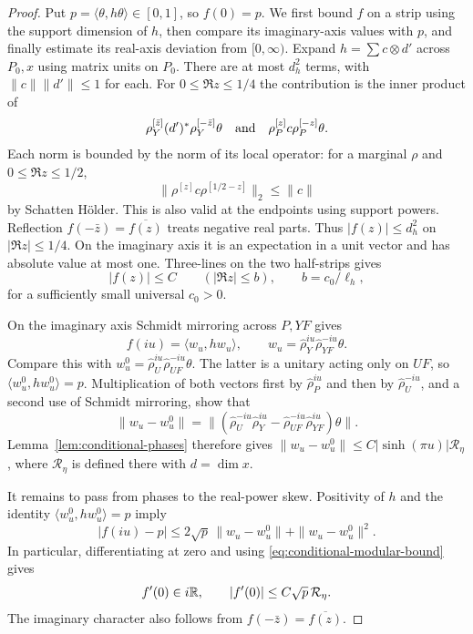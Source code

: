 \begin{proof}
Put $p=\langle\theta,h\theta\rangle\in[0,1]$, so $f(0)=p$.
We first bound $f$ on a strip using the support dimension of $h$,
then compare its imaginary-axis values with $p$, and finally estimate
its real-axis deviation from $[0,\infty)$.  Expand
$h=\sum c\otimes d'$ across $P_0,x$ using matrix units on $P_0$.
There are at most $d_h^2$ terms, with
$\|c\|\|d'\|\le1$ for each.  For $0\le\Re z\le1/4$ the
contribution is the inner product of
\[
 \rho_Y^{[\bar z]}(d')^*\rho_Y^{[-\bar z]}\theta
 \quad\hbox{and}\quad
 \rho_P^{[z]}c\rho_P^{[-z]}\theta.
\]
Each norm is bounded by the norm of its local operator: for a
marginal $\rho$ and $0\le\Re z\le1/2$,
\[
 \|\rho^{[z]}c\rho^{[1/2-z]}\|_2\le\|c\|
\]
by Schatten H\"older.  This is also valid at the endpoints using
support powers.  Reflection
$f(-\bar z)=\overline{f(z)}$ treats negative real parts.  Thus
$|f(z)|\le d_h^2$ on $|\Re z|\le1/4$.  On the imaginary axis
it is an expectation in a unit vector and has absolute value at
most one.  Three-lines on the two half-strips gives
\begin{equation}\label{eq:conditional-narrow-strip}
 |f(z)|\le C\qquad (|\Re z|\le b),
 \qquad b=c_0/\ell_h,
\end{equation}
for a sufficiently small universal $c_0>0$.

On the imaginary axis Schmidt mirroring across $P,YF$ gives
\[
 f(iu)=\langle w_u,hw_u\rangle,
 \qquad
 w_u=\widehat\rho_Y^{iu}\widehat\rho_{YF}^{-iu}\theta.
\]
Compare this with
$w_u^0=\widehat\rho_U^{iu}\widehat\rho_{UF}^{-iu}\theta$.
The latter is a unitary acting only on $UF$, so
$\langle w_u^0,hw_u^0\rangle=p$.  Multiplication of both vectors
first by $\widehat\rho_P^{iu}$ and then by
$\widehat\rho_U^{-iu}$, and a second use of Schmidt mirroring,
show that
\begin{equation}\label{eq:conditional-phase-discrepancy}
 \|w_u-w_u^0\|
 =\| (\widehat\rho_U^{-iu}\widehat\rho_Y^{iu}
       -\widehat\rho_{UF}^{-iu}\widehat\rho_{YF}^{iu})\theta\|.
\end{equation}
Lemma~\ref{lem:conditional-phases} therefore gives
$\|w_u-w_u^0\|\le C|\sinh(\pi u)|\mathcal R_\eta$, where
$\mathcal R_\eta$ is defined there with $d=\dim x$.

It remains to pass from phases to the real-power skew.  Positivity
of $h$ and the identity $\langle w_u^0,hw_u^0\rangle=p$ imply
\[
 |f(iu)-p|\le2\sqrt p\,\|w_u-w_u^0\|
                    +\|w_u-w_u^0\|^2.
\]
In particular, differentiating at zero and using
\eqref{eq:conditional-modular-bound} gives
\begin{equation}\label{eq:conditional-first-derivative}
 f'(0)\in i\mathbb R,\qquad |f'(0)|\le C\sqrt p\,\mathcal R_\eta.
\end{equation}
The imaginary character also follows from
$f(-\bar z)=\overline{f(z)}$.


\end{proof}
